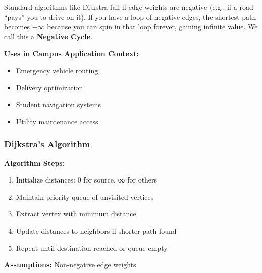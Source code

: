 \documentclass[
  letterpaper,
  DIV=11,
  numbers=noendperiod]{scrreprt}
\providecommand{\tightlist}{%
  \setlength{\itemsep}{0pt}\setlength{\parskip}{0pt}}
\begin{document}
\begin{tcolorbox}[enhanced jigsaw, leftrule=.75mm, rightrule=.15mm, colback=white, colbacktitle=quarto-callout-warning-color!10!white, arc=.35mm, opacityback=0, toptitle=1mm, bottomrule=.15mm, bottomtitle=1mm, titlerule=0mm, title=\textcolor{quarto-callout-warning-color}{\faExclamationTriangle}\hspace{0.5em}{Warning: The Negative Cycle Trap}, toprule=.15mm, left=2mm, coltitle=black, breakable, colframe=quarto-callout-warning-color-frame, opacitybacktitle=0.6]

Standard algorithms like Dijkstra fail if edge weights are negative
(e.g., if a road ``pays'' you to drive on it). If you have a loop of
negative edges, the shortest path becomes \(-\infty\) because you can
spin in that loop forever, gaining infinite value. We call this a
\textbf{Negative Cycle}.

\end{tcolorbox}

\textbf{Uses in Campus Application Context:}

\begin{itemize}
\tightlist
\item
  Emergency vehicle routing
\item
  Delivery optimization
\item
  Student navigation systems
\item
  Utility maintenance access
\end{itemize}

\subsubsection{Dijkstra's Algorithm}\label{dijkstras-algorithm}

\textbf{Algorithm Steps:}

\begin{enumerate}
\def\labelenumi{\arabic{enumi}.}
\tightlist
\item
  Initialize distances: 0 for source, ∞ for others
\item
  Maintain priority queue of unvisited vertices
\item
  Extract vertex with minimum distance
\item
  Update distances to neighbors if shorter path found
\item
  Repeat until destination reached or queue empty
\end{enumerate}

\textbf{Assumptions:} Non-negative edge weights
\end{document}
